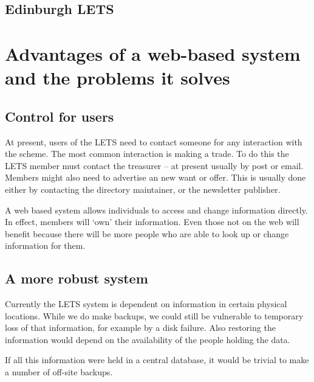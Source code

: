\documentclass[a4paper,11pt]{article}
\begin{document}
\subsection{Edinburgh LETS}

\clearpage %

\section{Advantages of a web-based system and the problems it solves}

\subsection{Control for users}
\label{control}

At present, users of the LETS need to contact someone for any interaction with the scheme. The most common interaction is making a trade. To do this the LETS member must contact the treasurer -- at present usually by post or email. Members might also need to advertise an new want or offer. This is usually done either by contacting the directory maintainer, or the newsletter publisher.

A web based system allows individuals to access and change information directly. In effect, members will `own' their information. Even those not on the web will benefit because there will be more people who are able to look up or change information for them. 

\subsection{A more robust system}

Currently the LETS system is dependent on information in certain physical locations. While we do make backups, we could still be vulnerable to temporary loss of that information, for example by a disk failure. Also restoring the information would depend on the availability of the people holding the data.

If all this information were held in a central database, it would be trivial to make a number of off-site backups.

\end{document}
